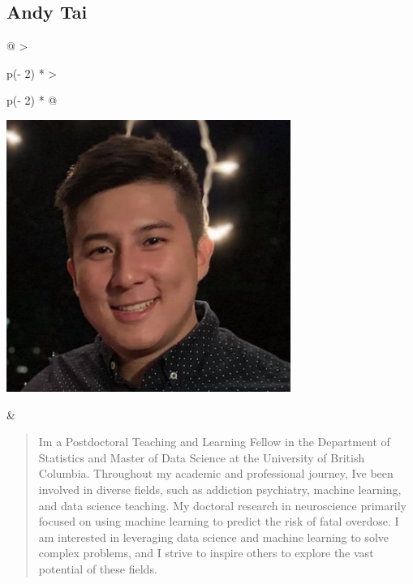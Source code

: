 \documentclass[
  letterpaper,
  DIV=11,
  numbers=noendperiod]{scrreprt}
\begin{document}
\subsection*{Andy Tai}\label{andy-tai}

\begin{longtable}[]{@{}
  >{\raggedright\arraybackslash}p{(\columnwidth - 2\tabcolsep) * }
  >{\raggedright\arraybackslash}p{(\columnwidth - 2\tabcolsep) * }@{}}
\toprule\noalign{}
\endhead
\bottomrule\noalign{}
\endlastfoot
\begin{minipage}[t]{\linewidth}\raggedright
\includegraphics[width=3.64583in,height=\textheight]{img/photo-andy.jpg}
\end{minipage} & \begin{minipage}[t]{\linewidth}\raggedright
\begin{quote}
I\textquotesingle m a Postdoctoral Teaching and Learning Fellow in the
Department of Statistics and Master of Data Science at the University of
British Columbia. Throughout my academic and professional journey,
I\textquotesingle ve been involved in diverse fields, such as addiction
psychiatry, machine learning, and data science teaching. My doctoral
research in neuroscience primarily focused on using machine learning to
predict the risk of fatal overdose. I am interested in leveraging data
science and machine learning to solve complex problems, and I strive to
inspire others to explore the vast potential of these fields.
\end{quote}
\end{minipage} \\
\end{longtable}
\end{document}
